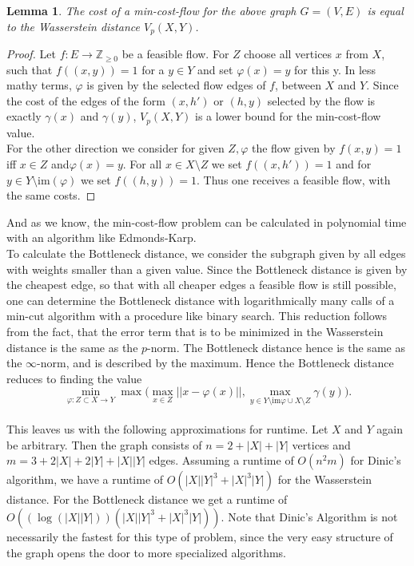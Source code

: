 \documentclass[11pt, a4paper, UKenglish]{article}
\newtheorem{lemma}{Lemma}
\newcommand{\bZ}{\mathbb{Z}}
\newcommand{\im}{\textrm{im}}
\begin{document}
    \begin{lemma}
        The cost of a min-cost-flow for the above graph $G=(V,E)$ is equal to the Wasserstein distance $V_p(X,Y)$.
    \end{lemma}
    \begin{proof}
        Let $f:E\rightarrow \bZ_{\geq0}$ be a feasible flow.
        For $Z$ choose all vertices $x$ from $X$, such that $f((x,y))=1$ for a $y\in Y$ and set $\varphi(x) = y$ for this y.
        In less mathy terms, $\varphi$ is given by the selected flow edges of $f$, between $X$ and $Y$.
        Since the cost of the edges of the form $(x,h')$ or $(h,y)$ selected by the flow is exactly $\gamma(x)$ and $\gamma(y)$, $V_p(X,Y)$ is a lower bound for the min-cost-flow value.\\
        For the other direction we consider for given $Z,\varphi$ the flow given by $f(x,y)=1$ iff $x\in Z$ and$ \varphi(x)=y$.
        For all $x\in X\setminus Z$ we set $f((x,h'))=1$ and for $y\in Y\setminus \im(\varphi)$ we set $f((h,y))=1$.
        Thus one receives a feasible flow, with the same costs.
    \end{proof}

    And as we know, the min-cost-flow problem can be calculated in polynomial time with an algorithm like Edmonds-Karp.\\
    To calculate the Bottleneck distance, we consider the subgraph given by all edges with weights smaller than a given value.
    Since the Bottleneck distance is given by the cheapest edge, so that with all cheaper edges a feasible flow is still possible, one can determine the Bottleneck distance with logarithmically many calls of a min-cut algorithm with a procedure like binary search.
    This reduction follows from the fact, that the error term that is to be minimized in the Wasserstein distance is the same as the $p$-norm.
    The Bottleneck distance hence is the same as the $\infty$-norm, and is described by the maximum.
    Hence the Bottleneck distance reduces to finding the value \[\min_{\varphi:Z\subset X \rightarrow Y} \max\bigg(\max_{x\in Z}||x - \varphi(x)||,\max_{y\in Y\setminus\im\varphi\cup X\setminus Z}\gamma(y)\bigg).\]\\
    This leaves us with the following approximations for runtime.
    Let $X$ and $Y$ again be arbitrary.
    Then the graph consists of $n=2+|X|+|Y|$ vertices and $m=3+2|X|+2|Y|+|X||Y|$ edges.
    Assuming a runtime of $O(n^2 m)$ for Dinic's algorithm, we have a runtime of $O(|X||Y|^3 + |X|^3|Y|)$ for the Wasserstein distance.
    For the Bottleneck distance we get a runtime of $O((\log(|X||Y|))(|X||Y|^3 + |X|^3|Y|))$.
    Note that Dinic's Algorithm is not necessarily the fastest for this type of problem, since the very easy structure of the graph opens the door to more specialized algorithms.
\end{document}
